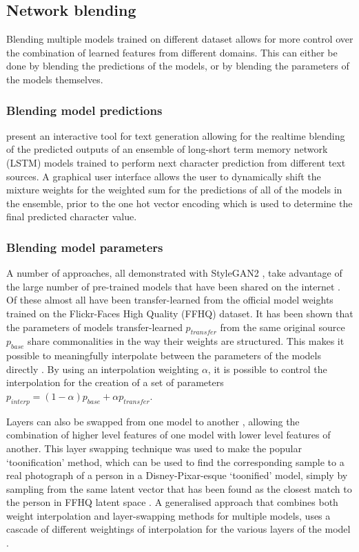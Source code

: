 \subsection{Network blending}
\label{survey:blending}

Blending multiple models trained on different dataset allows for more control over the combination of learned features from different domains. 
This can either be done by blending the predictions of the models, or by blending the parameters of the models themselves.

\subsubsection{Blending model predictions} 

\citet{akten2016real} present an interactive tool for text generation allowing for the realtime blending of the predicted outputs of an ensemble of long-short term memory network (LSTM) models \citep{hochreiter1997long} trained to perform next character prediction from different text sources. 
A graphical user interface allows the user to dynamically shift the mixture weights for the weighted sum for the predictions of all of the models in the ensemble, prior to the one hot vector encoding which is used to determine the final predicted character value.


\subsubsection{Blending model parameters} 
A number of approaches, all demonstrated with StyleGAN2 \citep{karras2019analyzing}, take advantage of the large number of pre-trained models that have been shared on the internet \citep{pinkney2020awesome}. 
Of these almost all have been transfer-learned from the official model weights trained on the Flickr-Faces High Quality (FFHQ) dataset.
It has been shown that the parameters of models transfer-learned $p_{transfer}$ from the same original source $p_{base}$ share commonalities in the way their weights are structured. 
This makes it possible to meaningfully interpolate between the parameters of the models directly \citep{aydao2020interp}. 
By using an interpolation weighting $\alpha$, it is possible to control the interpolation for the creation of a set of parameters $p_{interp} = (1 - \alpha)p_{base} + \alpha p_{transfer}$. 

Layers can also be swapped from one model to another \citep{pinkney2020interpolation}, allowing the combination of higher level features of one model with lower level features of another. 
This layer swapping technique was used to make the popular `toonification' method, which can be used to find the corresponding sample to a real photograph of a person in a Disney-Pixar-esque `toonified' model, simply by sampling from the same latent vector that has been found as the closest match to the person in FFHQ latent space \citep{abdal2019image2stylegan}. 
A generalised approach that combines both weight interpolation and layer-swapping methods for multiple models, uses a cascade of different weightings of interpolation for the various layers of the model \citep{arfafax2020barycentricnotebook}.

